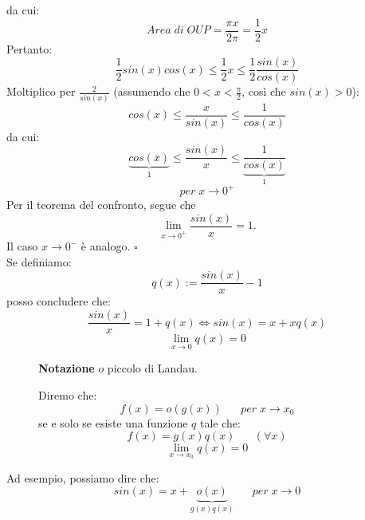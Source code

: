 \documentclass[a4paper]{article}
\theoremstyle{break}
\theoremstyle{break}
\theoremstyle{break}
\theoremstyle{break}
\begin{document}
da cui:
\[
  Area\; di\; OUP = \frac{\pi x}{2 \pi} = \frac{1}{2}x
\]
Pertanto:
\[
  \frac{1}{2}sin(x)cos(x) \le \frac{1}{2}x \le \frac{1}{2} \frac{sin(x)}{cos(x)}
\]
Moltiplico per \( \frac{2}{sin(x)} \) (assumendo che \( 0 < x < \frac{\pi}{2} \), così che \( sin(x) > 0 \)):
\[
  cos(x) \le \frac{x}{sin(x)} \le \frac{1}{cos(x)}
\]
da cui:
\[
  \underbrace{cos(x)}_{1} \le \frac{sin(x)}{x} \le \underbrace{\frac{1}{cos(x)}}_{1}
\]
\[
  per\; x \to  0^+
\]
Per il teorema del confronto, segue che
\[
  \lim_{x \to 0^+} \frac{sin(x)}{x} = 1.
\]
Il caso \( x \to 0^- \) è analogo. \( \square \)
\vspace{1cm}\\
Se definiamo:
\[
  q(x):=\frac{sin(x)}{x}-1
\]
posso concludere che:
\[
  \frac{sin(x)}{x}=1 + q(x) \Leftrightarrow sin(x)=x+xq(x)
\]
\[
  \lim_{x \to 0} q(x) = 0
\]
\begin{figure}[H]
  \begin{definition}
    \textbf{Notazione} \( o \) piccolo di Landau.

    Diremo che:
    \[
      f(x) = o(g(x))\;\;\;\;\;\; per\; x \to x_0
    \]
    se e solo se esiste una funzione \( q \) tale che:
    \[
      f(x) = g(x)q(x)\;\;\;\;\;\; (\forall x)
    \]
    \[
      \lim_{x \to x_0} q(x) = 0
    \]
  \end{definition}
\end{figure}
Ad esempio, possiamo dire che:
\[
  sin(x) = x + \underbrace{o(x)}_{g(x) q(x)}\;\;\;\;\;\; per\; x \to 0
\]
\end{document}
